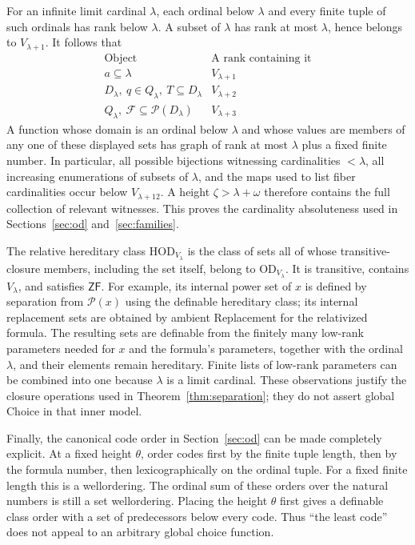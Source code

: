 \documentclass[11pt,letterpaper]{article}
\theoremstyle{definition}
\newcommand{\ZF}{\mathsf{ZF}}
\newcommand{\HOD}{\mathrm{HOD}}
\newcommand{\OD}{\mathrm{OD}}
\numberwithin{equation}{section}
\newcommand{\Pow}{\mathcal P}
\begin{document}
For an infinite limit cardinal $\lambda$, each ordinal below $\lambda$ and
every finite tuple of such ordinals has rank below $\lambda$. A subset of
$\lambda$ has rank at most $\lambda$, hence belongs to $V_{\lambda+1}$.
It follows that
\[
\begin{array}{c|c}
\text{Object} & \text{A rank containing it}\\ \hline
 a\subseteq\lambda & V_{\lambda+1}\\
 D_\lambda,\ q\in Q_\lambda,\ T\subseteq D_\lambda & V_{\lambda+2}\\
 Q_\lambda,\ \mathcal F\subseteq\Pow(D_\lambda) & V_{\lambda+3}
\end{array}
\]
A function whose domain is an ordinal below $\lambda$ and whose values
are members of any one of these displayed sets has graph of rank at most
$\lambda$ plus a fixed finite number. In particular, all possible bijections
witnessing cardinalities $<\lambda$, all increasing enumerations of subsets
of $\lambda$, and the maps used to list fiber cardinalities occur below
$V_{\lambda+12}$. A height $\zeta>\lambda+\omega$ therefore contains the full
collection of relevant witnesses. This proves the cardinality absoluteness
used in Sections~\ref{sec:od} and~\ref{sec:families}.

The relative hereditary class $\HOD_{V_\lambda}$ is the class of sets all of
whose transitive-closure members, including the set itself, belong to
$\OD_{V_\lambda}$. It is transitive, contains $V_\lambda$, and satisfies
$\ZF$. For example, its internal power set of $x$ is defined by separation
from $\Pow(x)$ using the definable hereditary class; its internal replacement
sets are obtained by ambient Replacement for the relativized formula.
The resulting sets are definable from the finitely many low-rank parameters
needed for $x$ and the formula's parameters, together with the ordinal
$\lambda$, and their elements remain hereditary. Finite lists of low-rank
parameters can be combined into one because $\lambda$ is a limit cardinal.
These observations justify the closure operations used in
Theorem~\ref{thm:separation}; they do not assert global Choice in that inner
model.

Finally, the canonical code order in Section~\ref{sec:od} can be made
completely explicit. At a fixed height $\theta$, order codes first by the
finite tuple length, then by the formula number, then lexicographically on
the ordinal tuple. For a fixed finite length this is a wellordering. The
ordinal sum of these orders over the natural numbers is still a set
wellordering. Placing the height $\theta$ first gives a definable class order
with a set of predecessors below every code. Thus ``the least code'' does
not appeal to an arbitrary global choice function.
\end{document}

